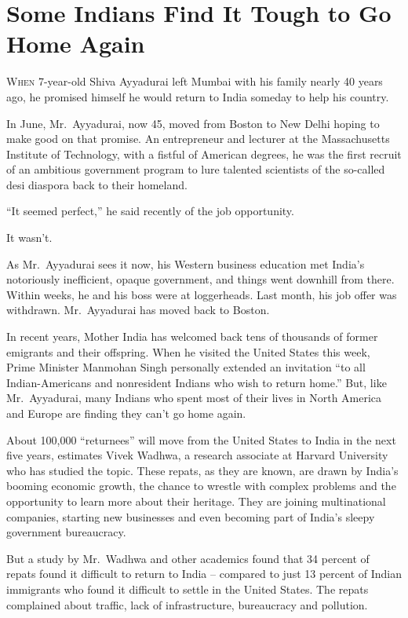 ﻿\documentclass[12pt]{article}
\begin{document}
\section{Some Indians Find It Tough to Go Home Again}

\lettrine{W}{hen} 7-year-old Shiva Ayyadurai left Mumbai with his family
nearly 40 years ago, he promised himself he would return to India someday to help his country.

In June, Mr.~Ayyadurai, now 45, moved from Boston to New Delhi hoping to make good on that promise.
An entrepreneur and lecturer at the Massachusetts Institute of Technology, with a fistful of
American degrees, he was the first recruit of an ambitious government program to lure talented
scientists of the so-called desi diaspora back to their homeland.

``It seemed perfect,'' he said recently of the job opportunity.

It wasn't.

As Mr.~Ayyadurai sees it now, his Western business education met India's notoriously inefficient,
opaque government, and things went downhill from there. Within weeks, he and his boss were at
loggerheads. Last month, his job offer was withdrawn. Mr.~Ayyadurai has moved back to Boston.

In recent years, Mother India has welcomed back tens of thousands of former emigrants and their
offspring. When he visited the United States this week, Prime Minister Manmohan Singh personally
extended an invitation ``to all Indian-Americans and nonresident Indians who wish to return home.''
But, like Mr.~Ayyadurai, many Indians who spent most of their lives in North America and Europe are
finding they can't go home again.

About 100,000 ``returnees'' will move from the United States to India in the next five years,
estimates Vivek Wadhwa, a research associate at Harvard University who has studied the topic. These
repats, as they are known, are drawn by India's booming economic growth, the chance to wrestle with
complex problems and the opportunity to learn more about their heritage. They are joining
multinational companies, starting new businesses and even becoming part of India's sleepy government
bureaucracy.

But a study by Mr.~Wadhwa and other academics found that 34 percent of repats found it difficult to
return to India -- compared to just 13 percent of Indian immigrants who found it difficult to settle
in the United States. The repats complained about traffic, lack of infrastructure, bureaucracy and
pollution.
\end{document}
